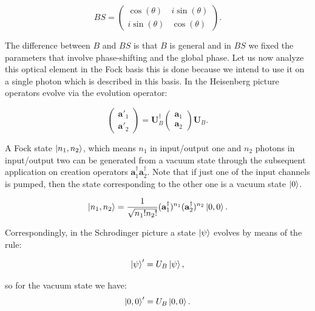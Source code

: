 \documentclass{book}
\begin{document}
\begin{equation}
BS=\begin{pmatrix} \cos(\theta) & i \sin(\theta) \\ i \sin(\theta) & \cos(\theta) \end{pmatrix}.
\end{equation}


The difference between $B$ and $BS$ is that $B$ is general and in $BS$ we fixed the parameters that involve phase-shifting and the global phase. Let us now analyze this optical element in the Fock basis this is done because we intend to use it on a single photon which is described in this basis. In the Heisenberg picture operators evolve via the evolution operator:

\begin{equation}
\begin{pmatrix} \mathbf{a}'_{1} \\ \mathbf{a}'_{2}\end{pmatrix}=\mathbf{U}^{\dagger}_{B} \begin{pmatrix} \mathbf{a}_{1} \\ \mathbf{a}_{2}\end{pmatrix} \mathbf{U}_{B}.
\label{Heisenberg}
\end{equation}

A Fock state $\ket{n_{1},n_{2}}$, which means $n_{1}$ in input/output one and $n_{2}$ photons in input/output two can be generated from a vacuum state through the subsequent application on creation operators  $\mathbf{a}^{\dagger}_{1}\mathbf{a}^{\dagger}_{2}$. Note that if just one of the input channels is pumped, then the state corresponding to the other one is a vacuum state $\ket{0}$.

\begin{equation}
 \ket{n_{1},n_{2}}=\frac{1}{\sqrt{n_{1}! n_{2}!}} (\mathbf{a}_{1}^{\dagger})^{n_{1}}(\mathbf{a}_{2}^{\dagger})^{n_{2}} \ket{0,0}.
\end{equation}

Correspondingly, in the Schrodinger picture a state $\ket{\psi}$ evolves by means of the rule:

\begin{equation}
 \ket{\psi}'=U_{B}\ket{\psi},
\end{equation}

so for the vacuum state we have:
\begin{equation}
 \ket{0,0}'=U_{B}\ket{0,0}.
 \label{evolution}
\end{equation}
\end{document}
